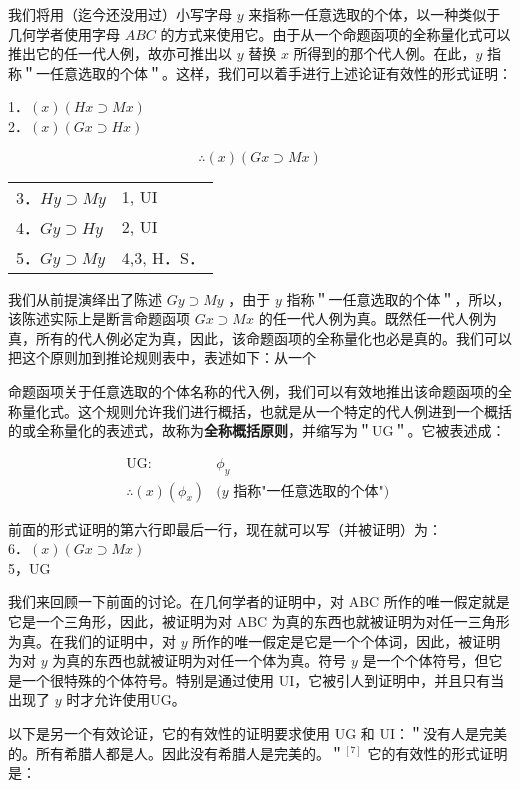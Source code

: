 我们将用（迄今还没用过）小写字母 $y$ 来指称一任意选取的个体，以一种类似于几何学者使用字母 $A B C$ 的方式来使用它。由于从一个命题函项的全称量化式可以推出它的任一代人例，故亦可推出以 $y$ 替换 $x$ 所得到的那个代人例。在此，$y$ 指称＂一任意选取的个体＂。这样，我们可以着手进行上述论证有效性的形式证明：

1．$(x)(H x \supset M x)$\\
2．$(x)(G x \supset H x)$

$$
\therefore(x)(G x \supset M x)
$$

\begin{center}
\begin{tabular}{ll}
3．$H y \supset M y$ & 1, UI \\
4．$G y \supset H y$ & 2, UI \\
5．$G y \supset M y$ & 4,3, H．S． \\
\end{tabular}
\end{center}

我们从前提演绎出了陈述 $G y \supset M y$ ，由于 $y$ 指称＂一任意选取的个体＂，所以，该陈述实际上是断言命题函项 $G x \supset M x$ 的任一代人例为真。既然任一代人例为真，所有的代人例必定为真，因此，该命题函项的全称量化也必是真的。我们可以把这个原则加到推论规则表中，表述如下：从一个

命题函项关于任意选取的个体名称的代入例，我们可以有效地推出该命题函项的全称量化式。这个规则允许我们进行概括，也就是从一个特定的代人例进到一个概括的或全称量化的表述式，故称为\textbf{全称概括原则}，并缩写为＂UG＂。它被表述成：

$$
\begin{aligned}
\mathrm{UG}: & \phi_{y} \\
\therefore(x)\left(\phi_{x}\right) & (y \text { 指称"一任意选取的个体") }
\end{aligned}
$$

前面的形式证明的第六行即最后一行，现在就可以写（并被证明）为：\\
6．$(x)(G x \supset M x)$\\
5，UG

我们来回顾一下前面的讨论。在几何学者的证明中，对 ABC 所作的唯一假定就是它是一个三角形，因此，被证明为对 ABC 为真的东西也就被证明为对任一三角形为真。在我们的证明中，对 $y$ 所作的唯一假定是它是一个个体词，因此，被证明为对 $y$ 为真的东西也就被证明为对任一个体为真。符号 $y$ 是一个个体符号，但它是一个很特殊的个体符号。特别是通过使用 UI，它被引人到证明中，并且只有当出现了 $y$ 时才允许使用UG。

以下是另一个有效论证，它的有效性的证明要求使用 UG 和 UI：＂没有人是完美的。所有希腊人都是人。因此没有希腊人是完美的。＂${ }^{[7]}$ 它的有效性的形式证明是：

